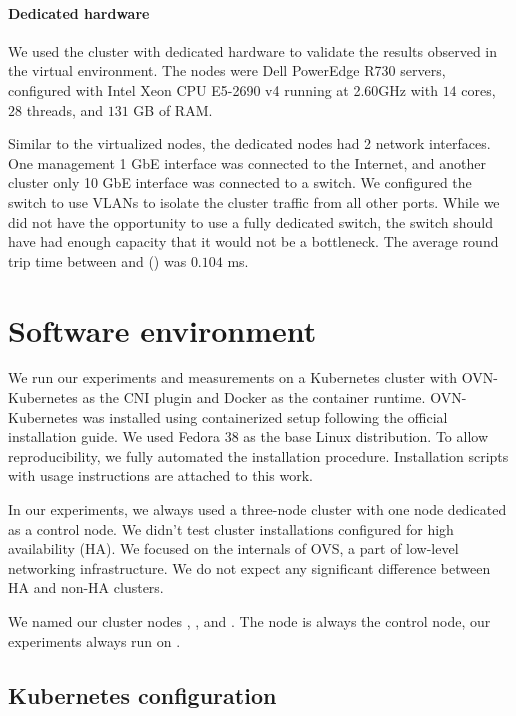 \paragraph{Dedicated hardware}

We used the cluster with dedicated hardware to validate the results observed in the virtual environment. The nodes were Dell PowerEdge R730 servers, configured with Intel\textsuperscript{\textregistered} Xeon\textsuperscript{\textregistered} CPU E5-2690 v4 running at 2.60GHz with $14$ cores, $28$ threads, and $131$ GB of RAM.

Similar to the virtualized nodes, the dedicated nodes had 2 network interfaces. One management 1 GbE interface was connected to the Internet, and another cluster only 10 GbE interface was connected to a switch. We configured the switch to use VLANs to isolate the cluster traffic from all other ports. While we did not have the opportunity to use a fully dedicated switch, the switch should have had enough capacity that it would not be a bottleneck. The average round trip time between  and  () was $0.104$ ms.

\section{Software environment}
\label{sec:sw-env}

We run our experiments and measurements on a Kubernetes cluster with OVN-Kubernetes as the CNI plugin and Docker as the container runtime. OVN-Kubernetes was installed using containerized setup following the official installation guide. We used Fedora 38 as the base Linux distribution. To allow reproducibility, we fully automated the installation procedure. Installation scripts with usage instructions are attached to this work.

In our experiments, we always used a three-node cluster with one node dedicated as a control node. We didn't test cluster installations configured for high availability (HA). We focused on the internals of OVS, a part of low-level networking infrastructure. We do not expect any significant difference between HA and non-HA clusters.

We named our cluster nodes , , and . The node  is always the control node, our experiments always run on .

\subsection{Kubernetes configuration}

